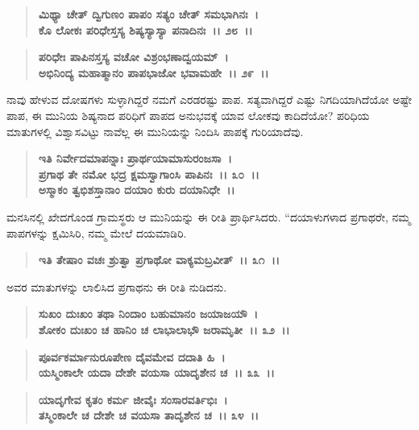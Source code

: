 \begin{verse}
\textbf{ಮಿಥ್ಯಾ ಚೇತ್ ದ್ವಿಗುಣಂ ಪಾಪಂ ಸತ್ಯಂ ಚೇತ್ ಸಮಭಾಗಿನಃ~।}\\\textbf{ಕೊ ಲೋಕಃ ಪರಿಧೇಸ್ತಸ್ಯ ಶಿಷ್ಯಸ್ಯಾಸ್ಯಾ ಪನಾದಿನಃ~।। ೨೮~।। }
\end{verse}

\begin{verse}
\textbf{ಪರಿಧೇಃ ಪಾಪಿನಸ್ತಸ್ಯ ವಚೋ ವಿಶ್ರಂಭಣಾದ್ವಯಮ್~।}\\\textbf{ಅಭಿನಿಂದ್ಯ ಮಹಾತ್ಮಾನಂ ಪಾಪಭಾಜೋ ಭವಾಮಹೇ~।। ೨೯~।।}
\end{verse}

ನಾವು ಹೇಳುವ ದೋಷಗಳು ಸುಳ್ಳಾಗಿದ್ದರೆ ನಮಗೆ ಎರಡರಷ್ಟು ಪಾಪ. ಸತ್ಯವಾಗಿದ್ದರೆ ಎಷ್ಟು ನಿಗದಿಯಾಗಿದೆಯೋ ಅಷ್ಟೇ ಪಾಪ, ಈ ಮುನಿಯ ಶಿಷ್ಯನಾದ ಪರಿಧಿಗೆ ಪಾಪದ ಅನುಭವಕ್ಕೆ ಯಾವ ಲೋಕವು ಕಾದಿದೆಯೋ? ಪರಿಧಿಯ ಮಾತುಗಳಲ್ಲಿ ವಿಶ್ವಾಸವಿಟ್ಟು ನಾವೆಲ್ಲ ಈ ಮುನಿಯನ್ನು ನಿಂದಿಸಿ ಪಾಪಕ್ಕೆ ಗುರಿಯಾದೆವು.

\begin{verse}
\textbf{ಇತಿ ನಿರ್ವೇದಮಾಪನ್ನಾಃ ಪ್ರಾರ್ಥಯಾಮಾಸುರಂಜಸಾ~।}\\\textbf{ಪ್ರಗಾಥ ತೇ ನಮೋ ಭದ್ರ ಕ್ಷಮಸ್ವಾಗಾಂಸಿ ಪಾಪಿನಃ~।। ೩೦~।।}\\\textbf{ಅಸ್ಮಾಕಂ ತ್ವಭಿಶಸ್ತಾನಾಂ ದಯಾಂ ಕುರು ದಯಾನಿಧೇ~।।}
\end{verse}

ಮನಸಿನಲ್ಲಿ ಖೇದಗೊಂಡ ಗ್ರಾಮಸ್ಥರು ಆ ಮುನಿಯನ್ನು ಈ ರೀತಿ ಪ್ರಾರ್ಥಿಸಿದರು. “ದಯಾಳುಗಳಾದ ಪ್ರಗಾಥರೇ, ನಮ್ಮ ಪಾಪಗಳನ್ನು ಕ್ಷಮಿಸಿರಿ, ನಮ್ಮ ಮೇಲೆ ದಯಮಾಡಿರಿ.

\begin{verse}
\textbf{ಇತಿ ತೇಷಾಂ ವಚಃ ಶ್ರುತ್ವಾ ಪ್ರಗಾಥೋ ವಾಕ್ಯಮಬ್ರವೀತ್~।। ೩೧~।।}
\end{verse}

ಅವರ ಮಾತುಗಳನ್ನು ಲಾಲಿಸಿದ ಪ್ರಗಾಥನು ಈ ರೀತಿ ನುಡಿದನು.

\begin{verse}
\textbf{ಸುಖಂ ದುಃಖಂ ತಥಾ ನಿಂದಾಂ ಬಹುಮಾನಂ ಜಯಾಜಯೌ~।}\\\textbf{ಶೋಕಂ ದುಃಖಂ ಚ ಹಾನಿಂ ಚ ಲಾಭಾಲಾಭೌ ಜರಾಮೃತೀ~।। ೩೨~।।}
\end{verse}

\begin{verse}
\textbf{ಪೂರ್ವಕರ್ಮಾನುರೂಪೇಣ ದೈವಮೇವ ದದಾತಿ ಹಿ~।}\\\textbf{ಯಸ್ಮಿಂಕಾಲೇ ಯದಾ ದೇಶೇ ವಯಸಾ ಯಾದೃಶೇನ ಚ~।। ೩೩~।।}
\end{verse}

\begin{verse}
\textbf{ಯಾದೃಗೇವ ಕೃತಂ ಕರ್ಮ ಜೀವೈಃ ಸಂಸಾರವರ್ತಿಭಿಃ~।}\\\textbf{ತಸ್ಮಿಂಕಾಲೇ ಚ ದೇಶೇ ಚ ವಯಸಾ ತಾದೃಶೇನ ಚ~।। ೩೪~।।}
\end{verse}

